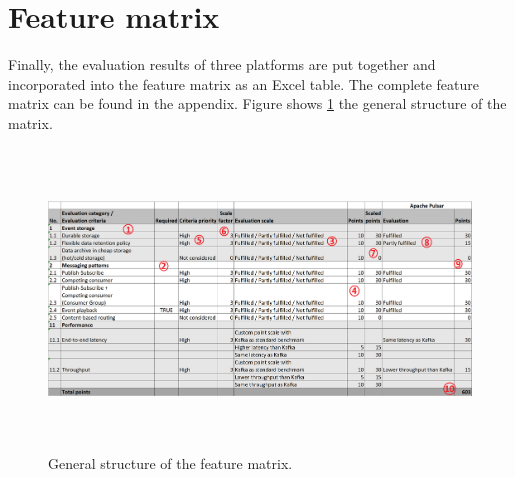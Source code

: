 \section{Feature matrix} 
Finally, the evaluation results of three platforms are put together and incorporated into the feature matrix as an Excel table. The complete feature matrix can be found in the appendix. Figure shows \ref{fig:featurematrix} the general structure of the matrix.

\begin{figure}[h]
	\begin{adjustwidth}{-1.5cm}{}
	\centering
	\includegraphics[width=18cm,height=8cm]{images/feature-matrix.png}
	\end{adjustwidth}
	\caption{General structure of the feature matrix.}
	\label{fig:featurematrix}
\end{figure}

